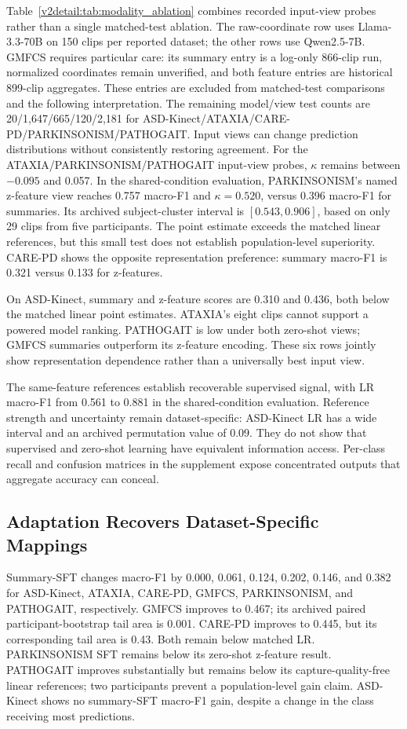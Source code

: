 




Table~\ref{v2detail:tab:modality_ablation} combines recorded input-view probes rather than a single matched-test ablation. The raw-coordinate row uses Llama-3.3-70B on 150 clips per reported dataset; the other rows use Qwen2.5-7B. GMFCS requires particular care: its summary entry is a log-only 866-clip run, normalized coordinates remain unverified, and both feature entries are historical 899-clip aggregates. These entries are excluded from matched-test comparisons and the following interpretation. The remaining model/view test counts are 20/1,647/665/120/2,181 for ASD-Kinect/ATAXIA/CARE-PD/PARKINSONISM/PATHOGAIT. Input views can change prediction distributions without consistently restoring agreement. For the ATAXIA/PARKINSONISM/PATHOGAIT input-view probes, $\kappa$ remains between $-0.095$ and 0.057. In the shared-condition evaluation, PARKINSONISM's named z-feature view reaches 0.757 macro-F1 and $\kappa=0.520$, versus 0.396 macro-F1 for summaries. Its archived subject-cluster interval is $[0.543,0.906]$, based on only 29 clips from five participants. The point estimate exceeds the matched linear references, but this small test does not establish population-level superiority. CARE-PD shows the opposite representation preference: summary macro-F1 is 0.321 versus 0.133 for z-features.

On ASD-Kinect, summary and z-feature scores are 0.310 and 0.436, both below the matched linear point estimates. ATAXIA's eight clips cannot support a powered model ranking. PATHOGAIT is low under both zero-shot views; GMFCS summaries outperform its z-feature encoding. These six rows jointly show representation dependence rather than a universally best input view.

The same-feature references establish recoverable supervised signal, with LR macro-F1 from 0.561 to 0.881 in the shared-condition evaluation. Reference strength and uncertainty remain dataset-specific: ASD-Kinect LR has a wide interval and an archived permutation value of 0.09. They do not show that supervised and zero-shot learning have equivalent information access. Per-class recall and confusion matrices in the supplement expose concentrated outputs that aggregate accuracy can conceal.

\subsection{Adaptation Recovers Dataset-Specific Mappings}
\label{sec:adaptation}
Summary-SFT changes macro-F1 by 0.000, 0.061, 0.124, 0.202, 0.146, and 0.382 for ASD-Kinect, ATAXIA, CARE-PD, GMFCS, PARKINSONISM, and PATHOGAIT, respectively. GMFCS improves to 0.467; its archived paired participant-bootstrap tail area is 0.001. CARE-PD improves to 0.445, but its corresponding tail area is 0.43. Both remain below matched LR. PARKINSONISM SFT remains below its zero-shot z-feature result. PATHOGAIT improves substantially but remains below its capture-quality-free linear references; two participants prevent a population-level gain claim. ASD-Kinect shows no summary-SFT macro-F1 gain, despite a change in the class receiving most predictions.

